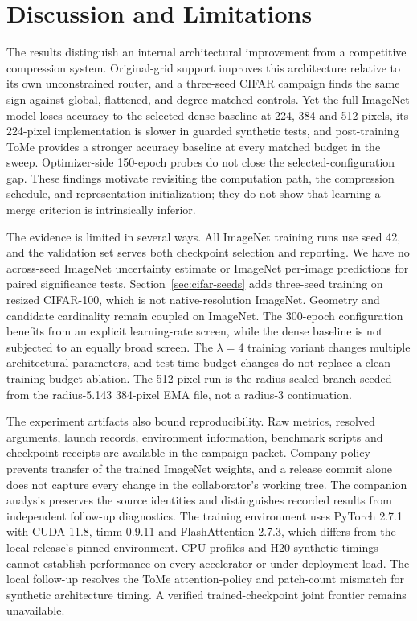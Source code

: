 \section{Discussion and Limitations}

The results distinguish an internal architectural improvement from a
competitive compression system. Original-grid support improves this
architecture relative to its own unconstrained router, and a three-seed
CIFAR campaign finds the same sign against global, flattened, and
degree-matched controls. Yet the full ImageNet model loses accuracy to the
selected dense baseline at 224, 384 and 512 pixels, its 224-pixel
implementation is slower in guarded synthetic tests, and post-training ToMe
provides a stronger accuracy baseline at every matched budget in the sweep.
Optimizer-side 150-epoch probes do not close the selected-configuration gap.
These findings motivate revisiting the computation path, the compression
schedule, and representation initialization; they do not show that learning a
merge criterion is intrinsically inferior.

The evidence is limited in several ways. All ImageNet training runs use seed
42, and the validation set serves both checkpoint selection and reporting.
We have no across-seed ImageNet uncertainty estimate or ImageNet per-image
predictions for paired significance tests. Section~\ref{sec:cifar-seeds} adds
three-seed training on resized CIFAR-100, which is not native-resolution
ImageNet.
Geometry and candidate cardinality remain coupled on ImageNet. The
300-epoch \mn{} configuration benefits from an explicit learning-rate screen,
while the dense baseline is not subjected to an equally broad screen. The
$\lambda=4$ training variant changes multiple architectural parameters, and
test-time budget changes do not replace a clean training-budget ablation.
The 512-pixel \mn{} run is the radius-scaled branch seeded from the
radius-5.143 384-pixel EMA file, not a radius-3 continuation.

The experiment artifacts also bound reproducibility. Raw metrics, resolved
arguments, launch records, environment information, benchmark scripts and
checkpoint receipts are available in the campaign packet. Company policy
prevents transfer of the trained ImageNet weights, and a release commit alone
does not capture every change in the collaborator's working tree. The companion
analysis preserves the source identities and distinguishes recorded results
from independent follow-up diagnostics. The training environment uses PyTorch
2.7.1 with CUDA 11.8, timm 0.9.11 and FlashAttention 2.7.3, which differs from
the local release's pinned environment. CPU profiles and H20 synthetic timings
cannot establish performance on every accelerator or under deployment load.
The local follow-up resolves the ToMe attention-policy and patch-count
mismatch for synthetic architecture timing. A verified trained-checkpoint
joint frontier remains unavailable.

